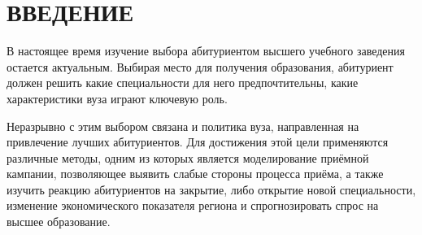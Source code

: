 \section*{ВВЕДЕНИЕ}

В настоящее время изучение выбора абитуриентом высшего учебного заведения остается актуальным. Выбирая место для получения образования, абитуриент должен решить какие специальности для него предпочтительны, какие характеристики вуза играют ключевую роль.

Неразрывно с этим выбором связана и политика вуза, направленная на привлечение лучших абитуриентов. Для достижения этой цели применяются различные методы, одним из которых является моделирование приёмной кампании, позволяющее выявить слабые стороны процесса приёма, а также
изучить реакцию абитуриентов на закрытие, либо открытие новой специальности, изменение экономического показателя региона и спрогнозировать спрос на высшее образование. 
\pagebreak